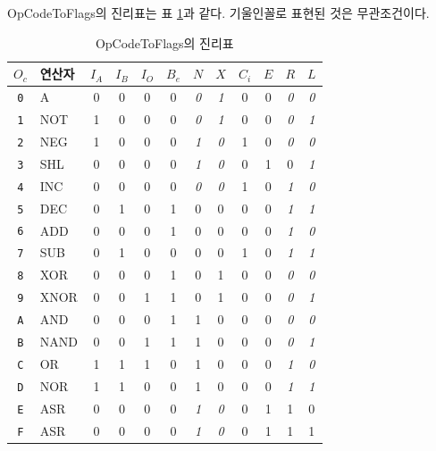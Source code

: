 \documentclass{article}
\renewcommand{\tablename}{표}
\begin{document}
OpCodeToFlags의 진리표는 \tablename{} \ref{tab:octf}과 같다.
기울인꼴로 표현된 것은 무관조건이다.

\begin{table}[h]
    \centering
    \begin{tabular}{cl||ccccccc|ccc}
        $O_c$ & 연산자 & $I_A$ & $I_B$ & $I_O$ & $B_e$ & $N$ & $X$ & $C_i$ & $E$ & $R$ & $L$ \\
        \hline
        \texttt{0} & A    & 0 & 0 & 0 & 0 & \textit 0 & \textit 1 & 0 & 0 & \textit 0 & \textit 0 \\
        \texttt{1} & NOT  & 1 & 0 & 0 & 0 & \textit 0 & \textit 1 & 0 & 0 & \textit 0 & \textit 1 \\
        \texttt{2} & NEG  & 1 & 0 & 0 & 0 & \textit 1 & \textit 0 & 1 & 0 & \textit 0 & \textit 0 \\
        \texttt{3} & SHL  & 0 & 0 & 0 & 0 & \textit 1 & \textit 0 & 0 & 1 & 0 & \textit 1\\
        \texttt{4} & INC  & 0 & 0 & 0 & 0 & \textit 0 & \textit 0 & 1 & 0 & \textit 1& \textit 0 \\
        \texttt{5} & DEC  & 0 & 1 & 0 & 1 & 0 & 0 & 0 & 0 & \textit 1& \textit 1\\
        \texttt{6} & ADD  & 0 & 0 & 0 & 1 & 0 & 0 & 0 & 0 & \textit 1& \textit 0 \\
        \texttt{7} & SUB  & 0 & 1 & 0 & 0 & 0 & 0 & 1 & 0 & \textit 1& \textit 1\\
        \texttt{8} & XOR  & 0 & 0 & 0 & 1 & 0 & 1 & 0 & 0 & \textit 0 & \textit 0 \\
        \texttt{9} & XNOR & 0 & 0 & 1 & 1 & 0 & 1 & 0 & 0 & \textit 0 & \textit 1\\
        \texttt{A} & AND  & 0 & 0 & 0 & 1 & 1 & 0 & 0 & 0 & \textit 0 & \textit 0 \\
        \texttt{B} & NAND & 0 & 0 & 1 & 1 & 1 & 0 & 0 & 0 & \textit 0 & \textit 1\\
        \texttt{C} & OR   & 1 & 1 & 1 & 0 & 1 & 0 & 0 & 0 & \textit 1& \textit 0 \\
        \texttt{D} & NOR  & 1 & 1 & 0 & 0 & 1 & 0 & 0 & 0 & \textit 1& \textit 1\\
        \texttt{E} & ASR  & 0 & 0 & 0 & 0 & \textit 1& \textit 0 & 0 & 1 & 1 & 0 \\
        \texttt{F} & ASR  & 0 & 0 & 0 & 0 & \textit 1& \textit 0 & 0 & 1 & 1 & 1 \\
    \end{tabular}
    \caption{OpCodeToFlags의 진리표}
    \label{tab:octf}
\end{table}
\end{document}
